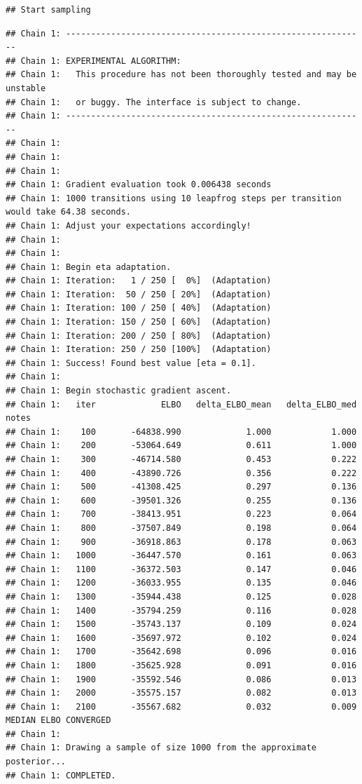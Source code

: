 \documentclass[
]{article}
\begin{document}
\begin{verbatim}
## Start sampling
\end{verbatim}

\begin{verbatim}
## Chain 1: ------------------------------------------------------------
## Chain 1: EXPERIMENTAL ALGORITHM:
## Chain 1:   This procedure has not been thoroughly tested and may be unstable
## Chain 1:   or buggy. The interface is subject to change.
## Chain 1: ------------------------------------------------------------
## Chain 1: 
## Chain 1: 
## Chain 1: 
## Chain 1: Gradient evaluation took 0.006438 seconds
## Chain 1: 1000 transitions using 10 leapfrog steps per transition would take 64.38 seconds.
## Chain 1: Adjust your expectations accordingly!
## Chain 1: 
## Chain 1: 
## Chain 1: Begin eta adaptation.
## Chain 1: Iteration:   1 / 250 [  0%]  (Adaptation)
## Chain 1: Iteration:  50 / 250 [ 20%]  (Adaptation)
## Chain 1: Iteration: 100 / 250 [ 40%]  (Adaptation)
## Chain 1: Iteration: 150 / 250 [ 60%]  (Adaptation)
## Chain 1: Iteration: 200 / 250 [ 80%]  (Adaptation)
## Chain 1: Iteration: 250 / 250 [100%]  (Adaptation)
## Chain 1: Success! Found best value [eta = 0.1].
## Chain 1: 
## Chain 1: Begin stochastic gradient ascent.
## Chain 1:   iter             ELBO   delta_ELBO_mean   delta_ELBO_med   notes 
## Chain 1:    100       -64838.990             1.000            1.000
## Chain 1:    200       -53064.649             0.611            1.000
## Chain 1:    300       -46714.580             0.453            0.222
## Chain 1:    400       -43890.726             0.356            0.222
## Chain 1:    500       -41308.425             0.297            0.136
## Chain 1:    600       -39501.326             0.255            0.136
## Chain 1:    700       -38413.951             0.223            0.064
## Chain 1:    800       -37507.849             0.198            0.064
## Chain 1:    900       -36918.863             0.178            0.063
## Chain 1:   1000       -36447.570             0.161            0.063
## Chain 1:   1100       -36372.503             0.147            0.046
## Chain 1:   1200       -36033.955             0.135            0.046
## Chain 1:   1300       -35944.438             0.125            0.028
## Chain 1:   1400       -35794.259             0.116            0.028
## Chain 1:   1500       -35743.137             0.109            0.024
## Chain 1:   1600       -35697.972             0.102            0.024
## Chain 1:   1700       -35642.698             0.096            0.016
## Chain 1:   1800       -35625.928             0.091            0.016
## Chain 1:   1900       -35592.546             0.086            0.013
## Chain 1:   2000       -35575.157             0.082            0.013
## Chain 1:   2100       -35567.682             0.032            0.009   MEDIAN ELBO CONVERGED
## Chain 1: 
## Chain 1: Drawing a sample of size 1000 from the approximate posterior... 
## Chain 1: COMPLETED.
\end{verbatim}
\end{document}
